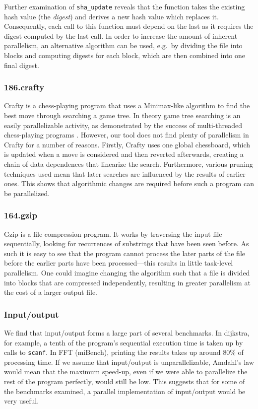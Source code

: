 Further examination of \texttt{sha\_update} reveals that the function takes the existing hash value (the \emph{digest}) and derives a new hash value which replaces it.
Consequently, each call to this function must depend on the last as it requires the digest computed by the last call.
In order to increase the amount of inherent parallelism, an alternative algorithm can be used, e.g.\ by dividing the file into blocks and computing digests for each block, which are then combined into one final digest.

\subsubsection{186.crafty}

Crafty is a chess-playing program that uses a Minimax-like algorithm to find the best move through searching a game tree.
In theory game tree searching is an easily parallelizable activity, as demonstrated by the success of multi-threaded chess-playing programs \cite{Dailey01usingcilk}.
However, our tool does not find plenty of parallelism in Crafty for a number of reasons.
Firstly, Crafty uses one global chessboard, which is updated when a move is considered and then reverted afterwards, creating a chain of data dependences that linearize the search.
Furthermore, various pruning techniques used mean that later searches are influenced by the results of earlier ones.
This shows that algorithmic changes are required before such a program can be parallelized.

\subsubsection{164.gzip}

Gzip is a file compression program.
It works by traversing the input file sequentially, looking for recurrences of substrings that have been seen before.
As such it is easy to see that the program cannot process the later parts of the file before the earlier parts have been processed---this results in little task-level parallelism.
One could imagine changing the algorithm such that a file is divided into blocks that are compressed independently, resulting in greater parallelism at the cost of a larger output file.

\subsubsection{Input/output}

We find that input/output forms a large part of several benchmarks.
In dijkstra, for example, a tenth of the program's sequential execution time is taken up by calls to \texttt{scanf}.
In FFT (miBench), printing the results takes up around 80\% of processing time.
If we assume that input/output is unparallelizable, Amdahl's law would mean that the maximum speed-up, even if we were able to parallelize the rest of the program perfectly, would still be low.
This suggests that for some of the benchmarks examined, a parallel implementation of input/output would be very useful.

